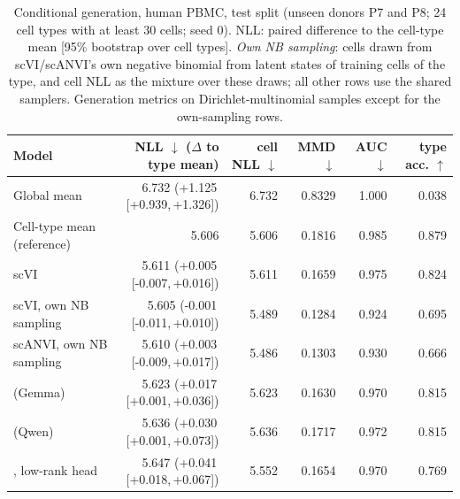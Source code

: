 \begin{table}[t]
\centering
\small
\setlength{\tabcolsep}{3.5pt}
\begin{tabular}{lrrrrr}
\toprule
Model & NLL $\downarrow$ ($\Delta$ to type mean) & cell NLL $\downarrow$ & MMD $\downarrow$ & AUC $\downarrow$ & type acc. $\uparrow$ \\
\midrule
Global mean & 6.732 (+1.125\,[+0.939,\,+1.326]) & 6.732 & 0.8329 & 1.000 & 0.038 \\
Cell-type mean (reference) & 5.606 & 5.606 & 0.1816 & 0.985 & 0.879 \\
scVI & 5.611 (+0.005\,[-0.007,\,+0.016]) & 5.611 & 0.1659 & 0.975 & 0.824 \\
scVI, own NB sampling & 5.605 (-0.001\,[-0.011,\,+0.010]) & 5.489 & 0.1284 & 0.924 & 0.695 \\
scANVI, own NB sampling & 5.610 (+0.003\,[-0.009,\,+0.017]) & 5.486 & 0.1303 & 0.930 & 0.666 \\
\rowcolor{ours}\cad{} (Gemma) & 5.623 (+0.017\,[+0.001,\,+0.036]) & 5.623 & 0.1630 & 0.970 & 0.815 \\
\rowcolor{ours}\cad{} (Qwen) & 5.636 (+0.030\,[+0.001,\,+0.073]) & 5.636 & 0.1717 & 0.972 & 0.815 \\
\rowcolor{ours}\cad{}, low-rank head & 5.647 (+0.041\,[+0.018,\,+0.067]) & 5.552 & 0.1654 & 0.970 & 0.769 \\
\bottomrule
\end{tabular}
\caption{Conditional generation, human PBMC, test split (unseen donors P7 and P8; 24 cell types with at least 30 cells; seed 0). NLL: paired difference to the cell-type mean [95\% bootstrap over cell types]. \emph{Own NB sampling}: cells drawn from scVI/scANVI's own negative binomial from latent states of training cells of the type, and cell NLL as the mixture over these draws; all other rows use the shared samplers. Generation metrics on Dirichlet-multinomial samples except for the own-sampling rows.}
\label{tab:pbmc_main}
\end{table}
